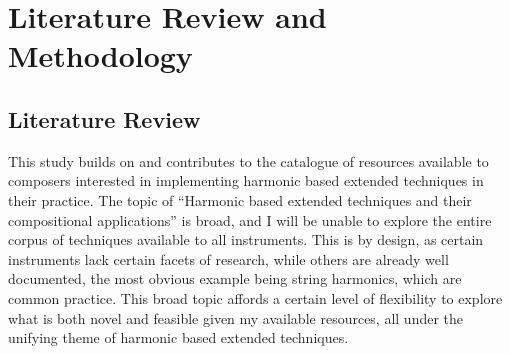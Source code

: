
\doublespace{}
\chapter{Literature Review and Methodology}

\section{Literature Review}
This study builds on and contributes to the catalogue of resources available to composers interested in implementing harmonic based extended techniques in their practice. The topic of “Harmonic based extended techniques and their compositional applications” is broad, and I will be unable to explore the entire corpus of techniques available to all instruments. This is by design, as certain instruments lack certain facets of research, while others are already well documented, the most obvious example being string harmonics, which are common practice. This broad topic affords a certain level of flexibility to explore what is both novel and feasible given my available resources, all under the unifying theme of harmonic based extended techniques.

